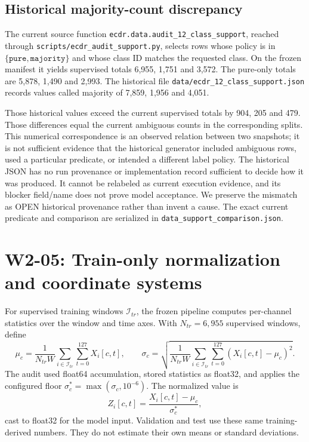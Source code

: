 \documentclass[11pt,a4paper]{article}
\newcommand{\code}[1]{{\small\ttfamily\nolinkurl{#1}}}
\begin{document}
\subsection{Historical majority-count discrepancy}
The current source function \code{ecdr.data.audit_12_class_support}, reached through \code{scripts/ecdr_audit_support.py}, selects rows whose policy is in $\{\texttt{pure},\texttt{majority}\}$ and whose class ID matches the requested class. On the frozen manifest it yields supervised totals 6,955, 1,751 and 3,572. The pure-only totals are 5,878, 1,490 and 2,993. The historical file \code{data/ecdr_12_class_support.json} records values called majority of 7,859, 1,956 and 4,051.

Those historical values exceed the current supervised totals by 904, 205 and 479. Those differences equal the current ambiguous counts in the corresponding splits. This numerical correspondence is an observed relation between two snapshots; it is not sufficient evidence that the historical generator included ambiguous rows, used a particular predicate, or intended a different label policy. The historical JSON has no run provenance or implementation record sufficient to decide how it was produced. It cannot be relabeled as current execution evidence, and its blocker field/name does not prove model acceptance. We preserve the mismatch as OPEN historical provenance rather than invent a cause. The exact current predicate and comparison are serialized in \code{data_support_comparison.json}.

\section{W2-05: Train-only normalization and coordinate systems}
For supervised training windows $\mathcal I_{tr}$, the frozen pipeline computes per-channel statistics over the window and time axes. With $N_{tr}=6,955$ supervised windows, define
\[
 \mu_c=\frac{1}{N_{tr}W}\sum_{i\in\mathcal I_{tr}}\sum_{t=0}^{127}X_i[c,t],\qquad
 \sigma_c=\sqrt{\frac{1}{N_{tr}W}\sum_{i\in\mathcal I_{tr}}\sum_{t=0}^{127}(X_i[c,t]-\mu_c)^2}.
\]
The audit used float64 accumulation, stored statistics as float32, and applies the configured floor $\sigma_c^*=\max(\sigma_c,10^{-6})$. The normalized value is
\[
 Z_i[c,t]=\frac{X_i[c,t]-\mu_c}{\sigma_c^*},
\]
cast to float32 for the model input. Validation and test use these same training-derived numbers. They do not estimate their own means or standard deviations.
\end{document}
